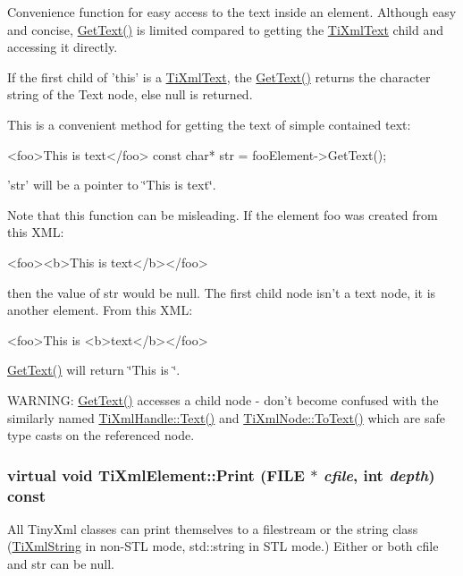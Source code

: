 \label{class_ti_xml_element_af3282294986cdb216646ea1f67af2c87}
Convenience function for easy access to the text inside an element. Although easy and concise, \hyperlink{class_ti_xml_element_af3282294986cdb216646ea1f67af2c87}{GetText()} is limited compared to getting the \hyperlink{class_ti_xml_text}{TiXmlText} child and accessing it directly.

If the first child of 'this' is a \hyperlink{class_ti_xml_text}{TiXmlText}, the \hyperlink{class_ti_xml_element_af3282294986cdb216646ea1f67af2c87}{GetText()} returns the character string of the Text node, else null is returned.

This is a convenient method for getting the text of simple contained text: \begin{DoxyVerb}
		<foo>This is text</foo>
		const char* str = fooElement->GetText();
		\end{DoxyVerb}


'str' will be a pointer to \char`\"{}This is text\char`\"{}.

Note that this function can be misleading. If the element foo was created from this XML: \begin{DoxyVerb}
		<foo><b>This is text</b></foo> 
		\end{DoxyVerb}


then the value of str would be null. The first child node isn't a text node, it is another element. From this XML: \begin{DoxyVerb}
		<foo>This is <b>text</b></foo> 
		\end{DoxyVerb}
 \hyperlink{class_ti_xml_element_af3282294986cdb216646ea1f67af2c87}{GetText()} will return \char`\"{}This is \char`\"{}.

WARNING: \hyperlink{class_ti_xml_element_af3282294986cdb216646ea1f67af2c87}{GetText()} accesses a child node -\/ don't become confused with the similarly named \hyperlink{class_ti_xml_handle_a9fc739c8a18d160006f82572fc143d13}{TiXmlHandle::Text()} and \hyperlink{class_ti_xml_node_a3ddfbcac78fbea041fad57e5c6d60a03}{TiXmlNode::ToText()} which are safe type casts on the referenced node. \hypertarget{class_ti_xml_element_afbf52736e70fc91ec9d760721d6f4fd2}{
\subsubsection[{Print}]{\setlength{\rightskip}{0pt plus 5cm}virtual void TiXmlElement::Print (FILE $\ast$ {\em cfile}, \/  int {\em depth}) const}}
\label{class_ti_xml_element_afbf52736e70fc91ec9d760721d6f4fd2}
All TinyXml classes can print themselves to a filestream or the string class (\hyperlink{class_ti_xml_string}{TiXmlString} in non-\/STL mode, std::string in STL mode.) Either or both cfile and str can be null.

